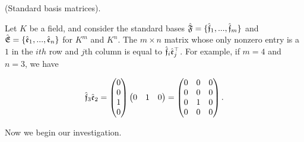 \begin{lemma}
    (Standard basis matrices).

    Let $K$ be a field, and consider the standard bases ${\hat{\mathfrak{F}}} = \{ \hat{\mathfrak{f}}_1, ..., \hat{\mathfrak{f}}_m\}$ and ${\hat{\mathfrak{E}}} = \{\hat{\mathfrak{e}}_1, ..., \hat{\mathfrak{e}}_n\}$ for $K^m$ and $K^n$. The $m \times n$ matrix whose only nonzero entry is a $1$ in the $ith$ row and $j$th column is equal to $\hat{\mathfrak{f}}_i \hat{\mathfrak{e}}_j^\top$. For example, if $m = 4$ and $n = 3$, we have

    \begin{align*}
        \hat{\mathfrak{f}}_3 \hat{\mathfrak{e}}_2 = 
        \begin{pmatrix}
            0 \\
            0 \\
            1 \\
            0
        \end{pmatrix}
        \begin{pmatrix}
            0 & 1 & 0
        \end{pmatrix}
        =
        \begin{pmatrix}
            0 & 0 & 0 \\
            0 & 0 & 0 \\
            0 & 1 & 0 \\
            0 & 0 & 0
        \end{pmatrix}.
    \end{align*}
\end{lemma}

Now we begin our investigation.

